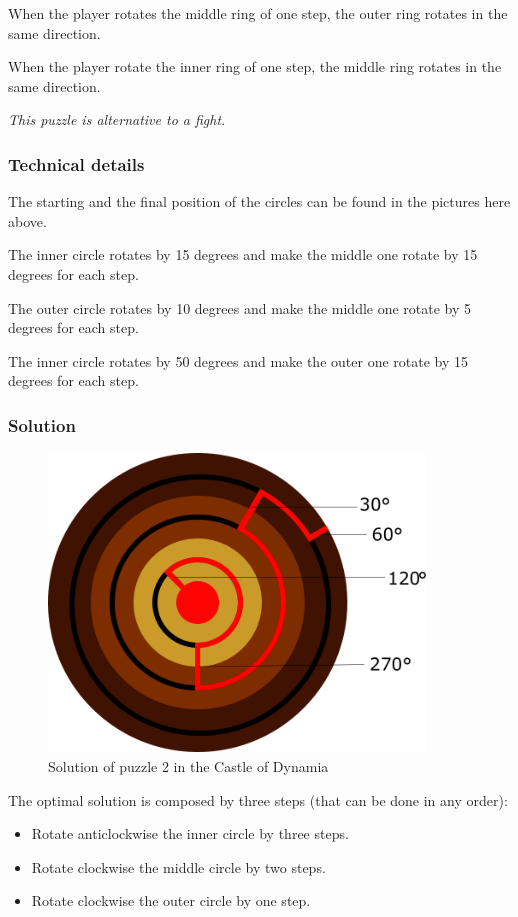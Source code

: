 When the player rotates the middle ring of one step, the outer ring rotates in the same direction.

When the player rotate the inner ring of one step, the middle ring rotates in the same direction.

\textit{This puzzle is alternative to a fight.}

\subsubsection*{Technical details}
The starting and the final position of the circles can be found in the pictures here above.

The inner circle rotates by 15 degrees and make the middle one rotate by 15 degrees for each step.

The outer circle rotates by 10 degrees and make the middle one rotate by 5 degrees for each step.

The inner circle rotates by 50 degrees and make the outer one rotate by 15 degrees for each step.

\subsubsection*{Solution}
\begin{figure}[H]
  \centering
  \includegraphics[width=10cm]{Images/Puzzles/castleOfDynamia2Solution}
  \caption{Solution of puzzle 2 in the Castle of Dynamia}
\end{figure}

The optimal solution is composed by three steps (that can be done in any order):
\begin{itemize}
	\item Rotate anticlockwise the inner circle by three steps.
	\item Rotate clockwise the middle circle by two steps.
	\item Rotate clockwise the outer circle by one step.
\end{itemize}

